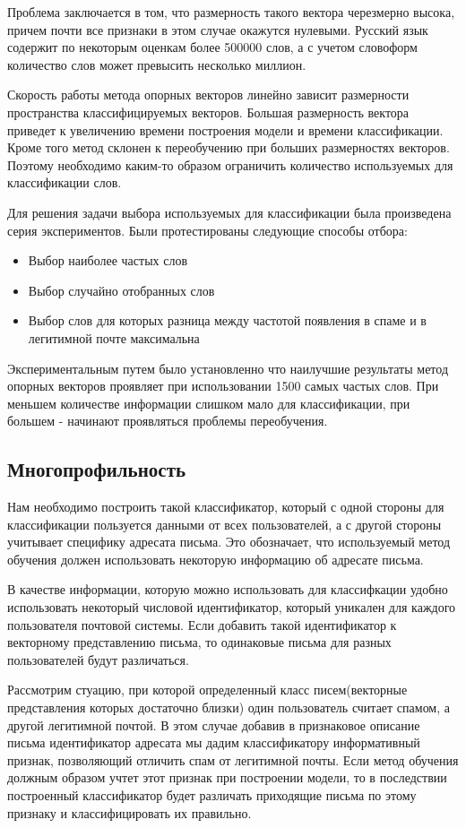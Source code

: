 Проблема заключается в том, что размерность такого вектора черезмерно высока, причем
почти все признаки в этом случае окажутся нулевыми. Русский язык содержит по некоторым оценкам более 500000\cite{TUTIN} слов, а с
учетом словоформ количество слов может превысить несколько миллион.

Скорость работы метода опорных векторов линейно зависит размерности пространства классифицируемых векторов.
Большая размерность вектора приведет к увеличению времени построения модели и времени классификации.
Кроме того метод склонен к переобучению при больших размерностях векторов. Поэтому необходимо каким-то образом ограничить количество используемых для классификации слов.

Для решения задачи выбора используемых для классификации была произведена серия экспериментов.
Были протестированы следующие способы отбора:
\begin{itemize}
\item Выбор наиболее частых слов
\item Выбор случайно отобранных слов
\item Выбор слов для которых разница между частотой появления в спаме и в легитимной почте максимальна
\end{itemize}

Экспериментальным путем было установленно что наилучшие результаты метод опорных векторов проявляет при использовании 1500 самых частых слов. При меньшем количестве информации слишком мало для классификации, при большем - начинают проявляться проблемы переобучения.

\subsection{Многопрофильность}
\label{MULTIPROFILE}
Нам необходимо построить такой классификатор, который с одной стороны для классификации пользуется данными от  всех пользователей, а с другой стороны учитывает специфику адресата письма.  Это обозначает, что используемый метод обучения должен использовать некоторую информацию об адресате письма. 

В качестве информации, которую можно использовать для классифкации удобно использовать некоторый числовой идентификатор, который уникален для каждого пользователя почтовой системы. Если добавить такой идентификатор к векторному представлению письма, то одинаковые письма для разных пользователей будут различаться. 

Рассмотрим стуацию, при которой определенный класс писем(векторные представления которых достаточно близки) один пользователь считает спамом, а другой легитимной почтой.  В этом случае добавив в признаковое описание письма идентификатор адресата мы дадим классификатору информативный признак, позволяющий отличить спам от легитимной почты. Если метод обучения должным образом учтет этот признак при построении модели, то в последствии построенный классификатор будет различать приходящие письма по этому признаку и классифицировать их правильно. 


